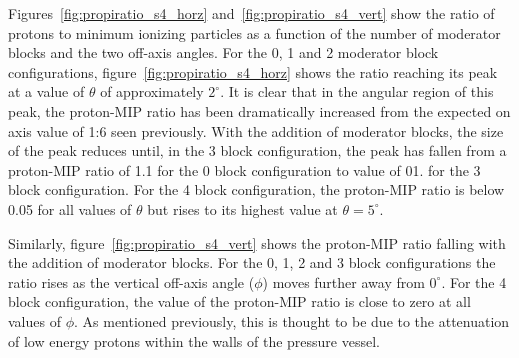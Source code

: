 Figures~\ref{fig:propiratio_s4_horz} and~\ref{fig:propiratio_s4_vert} show the ratio of protons to minimum ionizing particles as a function of the number of moderator blocks and the two off-axis angles.
For the 0, 1 and 2 moderator block configurations, figure~\ref{fig:propiratio_s4_horz} shows the ratio reaching its peak at a value of $\theta$ of approximately $2^{\circ}$.
It is clear that in the angular region of this peak, the proton-MIP ratio has been dramatically increased from the expected on axis value of 1:6 seen previously.
With the addition of moderator blocks, the size of the peak reduces until, in the 3 block configuration, the peak has fallen from a proton-MIP ratio of 1.1 for the 0 block configuration to value of 01. for the 3 block configuration. 
For the 4 block configuration, the proton-MIP ratio is below 0.05 for all values of $\theta$ but rises to its highest value at $\theta = 5^{\circ}$.

Similarly, figure~\ref{fig:propiratio_s4_vert} shows the proton-MIP ratio falling with the addition of moderator blocks.
For the 0, 1, 2 and 3 block configurations the ratio rises as the vertical off-axis angle ($\phi$) moves further away from $0^{\circ}$. 
For the 4 block configuration, the value of the proton-MIP ratio is close to zero at all values of $\phi$.
As mentioned previously, this is thought to be due to the attenuation of low energy protons within the walls of the pressure vessel.

